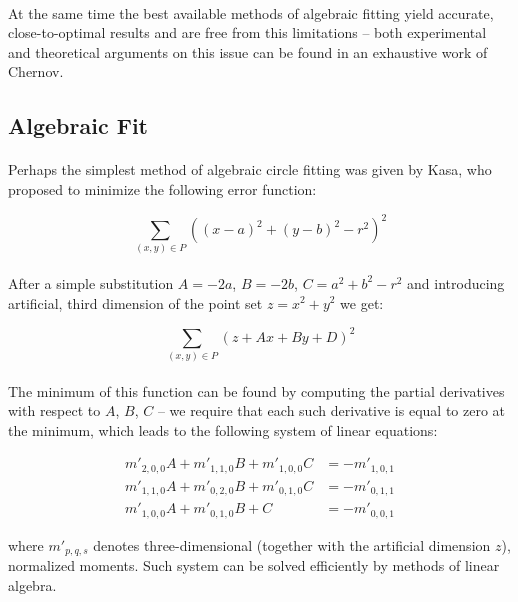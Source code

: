 \paragraph*{}
At the same time the best available methods of algebraic fitting yield accurate, close-to-optimal results and are free from this limitations -- both experimental and theoretical arguments on this issue can be found in an exhaustive work\cite{Chernov10} of Chernov.

\subsection{Algebraic Fit}

\paragraph*{}
Perhaps the simplest method of algebraic circle fitting was given by Kasa, who proposed to minimize the following error function:

\[
	\sum_{(x,y) \in P} ((x-a)^2 + (y-b)^2 - r^2)^2
\]

\paragraph*{}
After a simple substitution $A = -2a$, $B = -2b$, $C = a^2 + b^2 - r^2$ and introducing artificial, third dimension of the point set $z = x^2 + y^2$ we get:

\[
	\sum_{(x,y) \in P} (z + Ax + By + D)^2
\]

\paragraph*{}
The minimum of this function can be found by computing the partial derivatives with respect to $A$, $B$, $C$ -- we require that each such derivative is equal to zero at the minimum, which leads to the following system of linear equations:

\begin{align*}
	m'_{2,0,0}A + m'_{1,1,0}B + m'_{1,0,0}C &= -m'_{1,0,1}\\
	m'_{1,1,0}A + m'_{0,2,0}B + m'_{0,1,0}C &= -m'_{0,1,1}\\
	m'_{1,0,0}A + m'_{0,1,0}B + C &= -m'_{0,0,1}
\end{align*}

where $m'_{p,q,s}$ denotes three-dimensional (together with the artificial dimension $z$), normalized moments. Such system can be solved efficiently by methods of linear algebra.

